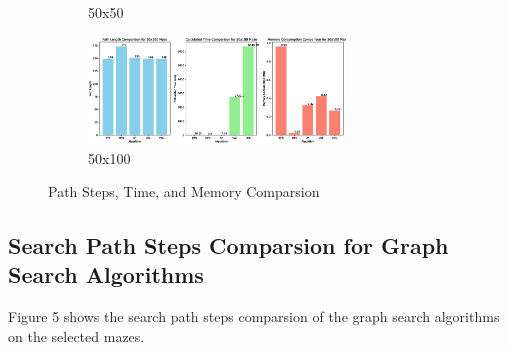 \documentclass{article}
\begin{document}
\begin{figure}[H]
\begin{subfigure}[b]{1\textwidth}
        \caption{50x50}
    \end{subfigure}
    \newline
    \begin{subfigure}[b]{1\textwidth}
        \centering
        \includegraphics[width=0.75\textwidth]{imgs/Path-Time-Memory-50-100.eps}
        \caption{50x100}
    \end{subfigure}
    \caption{Path Steps, Time, and Memory Comparsion}
\end{figure}
\newpage

\subsection{Search Path Steps Comparsion for Graph Search Algorithms}
Figure 5 shows the search path steps comparsion of the graph search algorithms on the selected mazes. 
\end{document}
